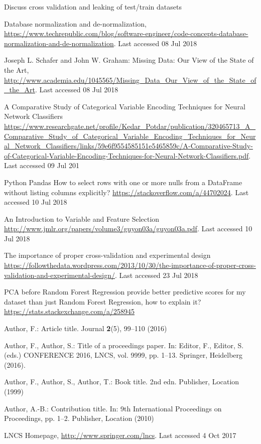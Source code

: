 \documentclass[runningheads]{llncs}
\begin{document}
Discuss cross validation and leaking of test/train datasets


%
%
%
% 
% 
%
\begin{thebibliography}{8}
Database normalization and de-normalization, \url{https://www.techrepublic.com/blog/software-engineer/code-concepts-database-normalization-and-de-normalization}. 
Last accessed 08 Jul 2018

Joseph L. Schafer and John W. Graham: Missing Data: Our View of the State of the Art, \url{http://www.academia.edu/1045565/Missing\_Data\_Our\_View\_of\_the\_State\_of\_the\_Art}. 
Last accessed 08 Jul 2018

A Comparative Study of Categorical Variable Encoding
Techniques for Neural Network Classifiers
\url{https://www.researchgate.net/profile/Kedar\_Potdar/publication/320465713\_A\_Comparative\_Study\_of\_Categorical\_Variable\_Encoding\_Techniques\_for\_Neural\_Network\_Classifiers/links/59e6f9554585151e5465859c/A-Comparative-Study-of-Categorical-Variable-Encoding-Techniques-for-Neural-Network-Classifiers.pdf}. Last accessed 09 Jul 201

Python Pandas How to select rows with one or more nulls from a DataFrame without listing columns explicitly?
\url{https://stackoverflow.com/a/44702024}. Last accessed 10 Jul 2018

An Introduction to Variable and Feature Selection
\url{http://www.jmlr.org/papers/volume3/guyon03a/guyon03a.pdf}. Last accessed 10 Jul 2018

The importance of proper cross-validation and experimental design
\url{https://followthedata.wordpress.com/2013/10/30/the-importance-of-proper-cross-validation-and-experimental-design/}. Last accessed 23 Jul 2018

PCA before Random Forest Regression provide better predictive scores for my dataset than just Random Forest Regression, how to explain it?
\url{https://stats.stackexchange.com/a/258945}

Author, F.: Article title. Journal \textbf{2}(5), 99--110 (2016)

Author, F., Author, S.: Title of a proceedings paper. In: Editor,
F., Editor, S. (eds.) CONFERENCE 2016, LNCS, vol. 9999, pp. 1--13.
Springer, Heidelberg (2016). 

Author, F., Author, S., Author, T.: Book title. 2nd edn. Publisher,
Location (1999)

Author, A.-B.: Contribution title. In: 9th International Proceedings
on Proceedings, pp. 1--2. Publisher, Location (2010)

LNCS Homepage, \url{http://www.springer.com/lncs}. Last accessed 4
Oct 2017
\end{thebibliography}
\setcounter{section}{0}
\end{document}
